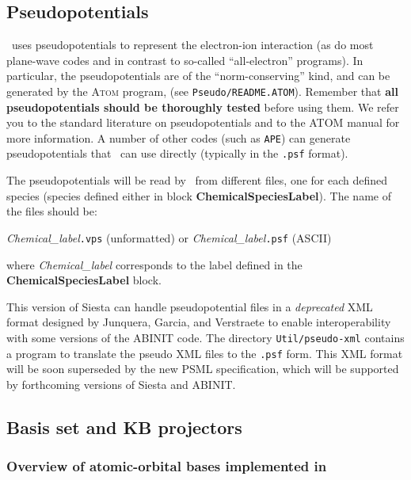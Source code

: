 \vspace{5pt}
\subsection{Pseudopotentials}

\siesta\ uses pseudopotentials to represent the electron-ion
interaction (as do most plane-wave codes and in contrast to so-called
``all-electron'' programs). In particular, the pseudopotentials are of
the ``norm-conserving'' kind, and can be generated by the \textsc{Atom} program,
(see \texttt{Pseudo/README.ATOM}). Remember that \textbf{all pseudopotentials
  should be thoroughly tested} before using them. We refer you to the
standard literature on pseudopotentials and to the \textsc{ATOM} manual
for more information. A number of
other codes (such as \texttt{APE}) can generate pseudopotentials that
\siesta\ can use directly (typically in the \texttt{.psf} format).

The pseudopotentials will be read by \siesta\ from different files, one
for each defined species (species defined either in block
\textbf{ChemicalSpeciesLabel}).
The name of the files should be:

\textit{Chemical\_label}\texttt{.vps} (unformatted) or
\textit{Chemical\_label}\texttt{.psf} (ASCII)

\noindent
where \textit{Chemical\_label} corresponds to the label defined in the
\textbf{ChemicalSpeciesLabel} block.

This version of Siesta can handle pseudopotential files in a
\textit{deprecated} XML format designed by Junquera, Garcia, and
Verstraete to enable interoperability with some versions of the
ABINIT code. The directory \texttt{Util/pseudo-xml} contains a program to
translate the pseudo XML files to the \texttt{.psf} form. This XML format
will be soon superseded by the new PSML specification, which will be
supported by forthcoming versions of Siesta and ABINIT.


\vspace{5pt}
\subsection{Basis set and KB projectors}

\subsubsection{Overview of atomic-orbital bases implemented in \texorpdfstring{\siesta}{SIESTA}}

